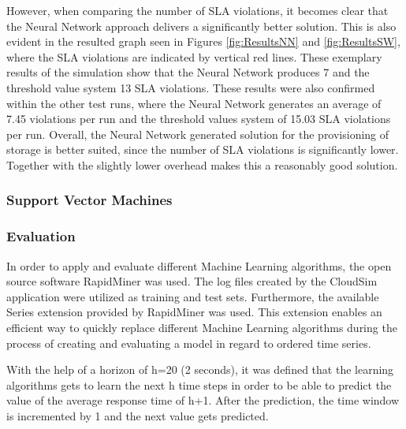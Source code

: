 However, when comparing the number of SLA violations, it becomes clear that the Neural Network approach delivers a significantly better solution. This is also evident in the resulted graph seen in Figures \ref{fig:ResultsNN} and \ref{fig:ResultsSW}, where the SLA violations are indicated by vertical red lines. These exemplary results of the simulation show that the Neural Network produces 7 and the threshold value system 13 SLA violations. These results were also confirmed within the other test runs, where the Neural Network generates an average of 7.45 violations per run and the threshold values system of 15.03 SLA violations per run. Overall, the Neural Network generated solution for the provisioning of storage is better suited, since the number of SLA violations is significantly lower. Together with the slightly lower overhead makes this a reasonably good solution.



\subsubsection{Support Vector Machines}\label{SVM}







\subsubsection{Evaluation}\label{MLeval}
In order to apply and evaluate different Machine Learning algorithms, the open source software RapidMiner \cite{rapidminer} was used. The log files created by the CloudSim application were utilized as training and test sets. Furthermore, the available Series extension provided by RapidMiner was used. This extension enables an efficient way to quickly replace different Machine Learning algorithms during the process of creating and evaluating a model in regard to ordered time series.

With the help of a horizon of h=20 (2 seconds), it was defined that the learning algorithms gets to learn the next h time steps in order to be able to predict the value of the average response time of h+1. After the prediction, the time window is incremented by 1 and the next value gets predicted. 

